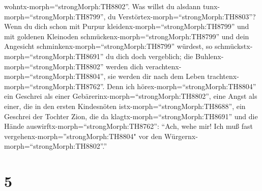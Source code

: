 wohntx-morph=``strongMorph:TH8802''.  Was willst du alsdann
tunx-morph=``strongMorph:TH8799'', du
Verstörtex-morph=``strongMorph:TH8803''? Wenn du dich schon mit Purpur
kleidenx-morph=``strongMorph:TH8799'' und mit goldenen Kleinoden
schmückenx-morph=``strongMorph:TH8799'' und dein Angesicht
schminkenx-morph=``strongMorph:TH8799'' würdest, so
schmückstx-morph=``strongMorph:TH8691'' du dich doch vergeblich; die
Buhlenx-morph=``strongMorph:TH8802'' werden dich
verachtenx-morph=``strongMorph:TH8804'', sie werden dir nach dem Leben
trachtenx-morph=``strongMorph:TH8762''.  Denn ich
hörex-morph=``strongMorph:TH8804'' ein Geschrei als einer
Gebärerinx-morph=``strongMorph:TH8802'', eine Angst als einer, die in
den ersten Kindesnöten istx-morph=``strongMorph:TH8688'', ein Geschrei
der Tochter Zion, die da klagtx-morph=``strongMorph:TH8691'' und die
Hände auswirftx-morph=``strongMorph:TH8762'': ``Ach, wehe mir! Ich muß
fast vergehenx-morph=''strongMorph:TH8804" vor den
Würgernx-morph=``strongMorph:TH8802''.''

\hypertarget{section-4}{%
\section{5}\label{section-4}}

